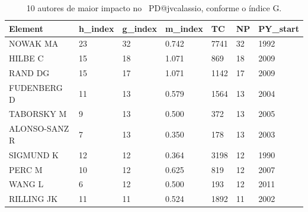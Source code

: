 \begin{table}[htp]
    \centering
    \footnotesize
    \begin{tabular}{|l|l|l|l|l|l|l|}
    \hline
        Element & h\_index & g\_index & m\_index & TC & NP & PY\_start \\ \hline
        NOWAK MA & 23 & 32 & 0.742 & 7741 & 32 & 1992 \\ \hline
        HILBE C & 15 & 18 & 1.071 & 869 & 18 & 2009 \\ \hline
        RAND DG & 15 & 17 & 1.071 & 1142 & 17 & 2009 \\ \hline
        FUDENBERG D & 11 & 13 & 0.579 & 1564 & 13 & 2004 \\ \hline
        TABORSKY M & 9 & 13 & 0.500 & 372 & 13 & 2005 \\ \hline
        ALONSO-SANZ R & 7 & 13 & 0.350 & 178 & 13 & 2003 \\ \hline
        SIGMUND K & 12 & 12 & 0.364 & 3198 & 12 & 1990 \\ \hline
        PERC M & 10 & 12 & 0.625 & 819 & 12 & 2007 \\ \hline
        WANG L & 6 & 12 & 0.500 & 193 & 12 & 2011 \\ \hline
        RILLING JK & 11 & 11 & 0.524 & 1892 & 11 & 2002 \\ \hline
    \end{tabular}
    \caption{10 autores de maior impacto no \dataset\ PD@jvcalassio, conforme o índice G.}
    \label{tab:PD@jvcalassio:Author:ImpactoG}
\end{table}

